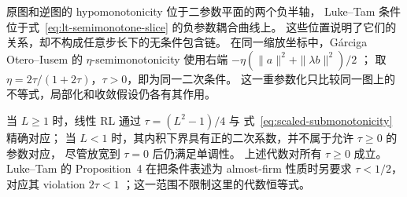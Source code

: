 \begin{remark}[代数对应与定义范围]
原图和逆图的 hypomonotonicity 位于二参数平面的两个负半轴，
Luke--Tam 条件位于式~\eqref{eq:lt-semimonotone-slice} 的负参数耦合曲线上。
这些位置说明了它们的关系，却不构成任意步长下的无条件包含链。
在同一缩放坐标中，G\'arciga Otero--Iusem 的
$\eta$-semimonotonicity 使用右端
$-\eta(\|a\|^2+\|\lambda b\|^2)/2$
\cite[Definition~2]{OteroIusemSemimonotonicity}；
取 $\eta=2\tau/(1+2\tau)$，$\tau>0$，即为同一二次条件。
这一重参数化只比较同一图上的不等式，局部化和收敛假设仍各有其作用。

当 $L\ge1$ 时，线性 RL 通过 $\tau=(L^2-1)/4$ 与
式~\eqref{eq:scaled-submonotonicity} 精确对应；
当 $L<1$ 时，其内积下界具有正的二次系数，并不属于允许 $\tau\ge0$ 的参数对应，
尽管放宽到 $\tau=0$ 后仍满足单调性。
上述代数对所有 $\tau\ge0$ 成立。
Luke--Tam 的 Proposition~4 在把条件表述为 almost-firm 性质时另要求
$\tau<1/2$，对应其 violation $2\tau<1$
\cite{LukeTam2025GeneralizedMonotonicity}；这一范围不限制这里的代数恒等式。
\end{remark}

